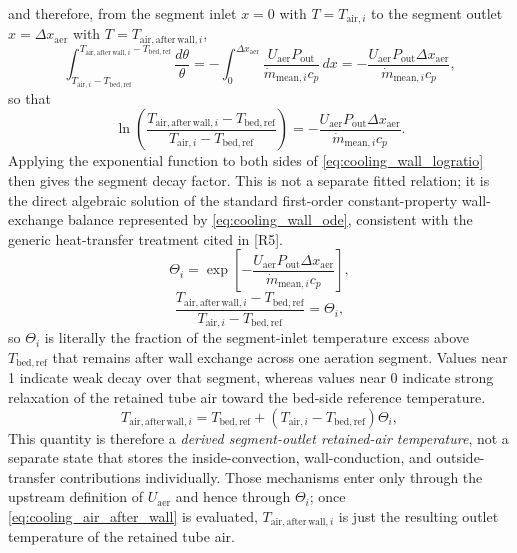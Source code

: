 \documentclass[11pt]{article}
\begin{document}
and therefore, from the segment inlet \(x=0\) with \(T=T_{\mathrm{air},i}\) to the segment outlet \(x=\Delta x_{\mathrm{aer}}\) with \(T=T_{\mathrm{air,after\,wall},i}\),
\begin{equation}
\label{eq:cooling_wall_integrated}
\int_{T_{\mathrm{air},i}-T_{\mathrm{bed,ref}}}^{T_{\mathrm{air,after\,wall},i}-T_{\mathrm{bed,ref}}}
\frac{d\theta}{\theta}
=
-\int_0^{\Delta x_{\mathrm{aer}}}
\frac{U_{\mathrm{aer}}P_{\mathrm{out}}}
{\dot m_{\mathrm{mean},i}c_p}\,dx
=
-\frac{U_{\mathrm{aer}}P_{\mathrm{out}}\Delta x_{\mathrm{aer}}}
{\dot m_{\mathrm{mean},i}c_p},
\end{equation}
so that
\begin{equation}
\label{eq:cooling_wall_logratio}
\ln\!\left(
\frac{T_{\mathrm{air,after\,wall},i}-T_{\mathrm{bed,ref}}}
{T_{\mathrm{air},i}-T_{\mathrm{bed,ref}}}
\right)
=
-\frac{U_{\mathrm{aer}}P_{\mathrm{out}}\Delta x_{\mathrm{aer}}}
{\dot m_{\mathrm{mean},i}c_p}.
\end{equation}
\noindent Applying the exponential function to both sides of \eqref{eq:cooling_wall_logratio} then gives the segment decay factor. This is not a separate fitted relation; it is the direct algebraic solution of the standard first-order constant-property wall-exchange balance represented by \eqref{eq:cooling_wall_ode}, consistent with the generic heat-transfer treatment cited in [R5].
\begin{equation}
\label{eq:cooling_wall_factor}
\Theta_i=\exp\!\left[-\frac{U_{\mathrm{aer}}P_{\mathrm{out}}\Delta x_{\mathrm{aer}}}{\dot m_{\mathrm{mean},i}c_p}\right],
\end{equation}
\begin{equation}
\label{eq:cooling_wall_ratio}
\frac{T_{\mathrm{air,after\,wall},i}-T_{\mathrm{bed,ref}}}
{T_{\mathrm{air},i}-T_{\mathrm{bed,ref}}}
=\Theta_i,
\end{equation}
so \(\Theta_i\) is literally the fraction of the segment-inlet temperature excess above \(T_{\mathrm{bed,ref}}\) that remains after wall exchange across one aeration segment. Values near 1 indicate weak decay over that segment, whereas values near 0 indicate strong relaxation of the retained tube air toward the bed-side reference temperature.
\begin{equation}
\label{eq:cooling_air_after_wall}
T_{\mathrm{air,after\,wall},i}=T_{\mathrm{bed,ref}}+\left(T_{\mathrm{air},i}-T_{\mathrm{bed,ref}}\right)\Theta_i,
\end{equation}
This quantity is therefore a \emph{derived segment-outlet retained-air temperature}, not a separate state that stores the inside-convection, wall-conduction, and outside-transfer contributions individually. Those mechanisms enter only through the upstream definition of \(U_{\mathrm{aer}}\) and hence through \(\Theta_i\); once \eqref{eq:cooling_air_after_wall} is evaluated, \(T_{\mathrm{air,after\,wall},i}\) is just the resulting outlet temperature of the retained tube air.
\end{document}
